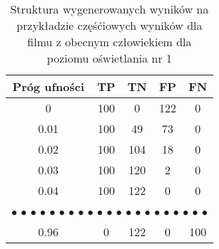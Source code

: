 \begin{table}[H]
    \centering
    \caption{Struktura wygenerowanych wyników na przykładzie częśćiowych wyników dla filmu z obecnym człowiekiem dla poziomu oświetlania nr 1}
    \begin{tabular}{ccccc}
    \hline
    \multicolumn{1}{|c|}{Próg   ufności}                    & \multicolumn{1}{c|}{TP}                    & \multicolumn{1}{c|}{TN}                    & \multicolumn{1}{c|}{FP}                    & \multicolumn{1}{c|}{FN}                    \\ \hline
    \multicolumn{1}{|c|}{0}                                 & \multicolumn{1}{c|}{100}                   & \multicolumn{1}{c|}{0}                     & \multicolumn{1}{c|}{122}                   & \multicolumn{1}{c|}{0}                     \\ \hline
    \multicolumn{1}{|c|}{0.01}                              & \multicolumn{1}{c|}{100}                   & \multicolumn{1}{c|}{49}                    & \multicolumn{1}{c|}{73}                    & \multicolumn{1}{c|}{0}                     \\ \hline
    \multicolumn{1}{|c|}{0.02}                              & \multicolumn{1}{c|}{100}                   & \multicolumn{1}{c|}{104}                   & \multicolumn{1}{c|}{18}                    & \multicolumn{1}{c|}{0}                     \\ \hline
    \multicolumn{1}{|c|}{0.03}                              & \multicolumn{1}{c|}{100}                   & \multicolumn{1}{c|}{120}                   & \multicolumn{1}{c|}{2}                     & \multicolumn{1}{c|}{0}                     \\ \hline
    \multicolumn{1}{|c|}{0.04}                              & \multicolumn{1}{c|}{100}                   & \multicolumn{1}{c|}{122}                   & \multicolumn{1}{c|}{0}                     & \multicolumn{1}{c|}{0}                     \\ \hline
    \multicolumn{5}{c}{$\bullet$ $\bullet$   $\bullet$ $\bullet$ $\bullet$ $\bullet$ $\bullet$ $\bullet$ $\bullet$   $\bullet$ $\bullet$ $\bullet$ $\bullet$ $\bullet$ $\bullet$ $\bullet$   $\bullet$ $\bullet$ $\bullet$ $\bullet$ $\bullet$} \\ \hline
    \multicolumn{1}{|c|}{0.96}                              & \multicolumn{1}{c|}{0}                     & \multicolumn{1}{c|}{122}                   & \multicolumn{1}{c|}{0}                     & \multicolumn{1}{c|}{100}                   \\ \hline

\end{tabular}
\end{table}
